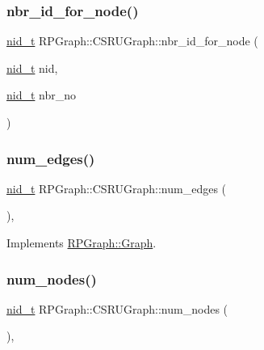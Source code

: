 \subsubsection{\texorpdfstring{nbr\+\_\+id\+\_\+for\+\_\+node()}{nbr\_id\_for\_node()}}
{\footnotesize\ttfamily \mbox{\hyperlink{namespaceRPGraph_ab3ae34f1ab88e48f43794c30c8697b74}{nid\+\_\+t}} R\+P\+Graph\+::\+C\+S\+R\+U\+Graph\+::nbr\+\_\+id\+\_\+for\+\_\+node (\begin{DoxyParamCaption}\item[{\mbox{\hyperlink{namespaceRPGraph_ab3ae34f1ab88e48f43794c30c8697b74}{nid\+\_\+t}}}]{nid,  }\item[{\mbox{\hyperlink{namespaceRPGraph_ab3ae34f1ab88e48f43794c30c8697b74}{nid\+\_\+t}}}]{nbr\+\_\+no }\end{DoxyParamCaption})}

\mbox{\label{classRPGraph_1_1CSRUGraph_a90ef3e196b0e234c8806bc455031018d}} 
\subsubsection{\texorpdfstring{num\+\_\+edges()}{num\_edges()}}
{\footnotesize\ttfamily \mbox{\hyperlink{namespaceRPGraph_ab3ae34f1ab88e48f43794c30c8697b74}{nid\+\_\+t}} R\+P\+Graph\+::\+C\+S\+R\+U\+Graph\+::num\+\_\+edges (\begin{DoxyParamCaption}{ }\end{DoxyParamCaption})\hspace{0.3cm}{\ttfamily [override]}, {\ttfamily [virtual]}}



Implements \mbox{\hyperlink{classRPGraph_1_1Graph_acd3b877216686aff2f7fbc2d62bcdf9b}{R\+P\+Graph\+::\+Graph}}.

\mbox{\label{classRPGraph_1_1CSRUGraph_a715af46d35bbe09b6b7d724461a1c2a5}} 
\subsubsection{\texorpdfstring{num\+\_\+nodes()}{num\_nodes()}}
{\footnotesize\ttfamily \mbox{\hyperlink{namespaceRPGraph_ab3ae34f1ab88e48f43794c30c8697b74}{nid\+\_\+t}} R\+P\+Graph\+::\+C\+S\+R\+U\+Graph\+::num\+\_\+nodes (\begin{DoxyParamCaption}{ }\end{DoxyParamCaption})\hspace{0.3cm}{\ttfamily [override]}, {\ttfamily [virtual]}}



